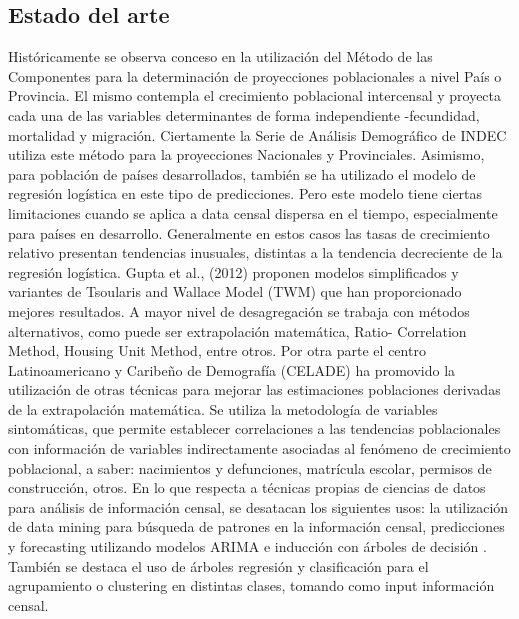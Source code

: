 \documentclass{article}
\theoremstyle{mytheoremstyle}
\theoremstyle{mytheoremstyle}
\theoremstyle{myproblemstyle}
\begin{document}
  \subsection{Estado del arte}
Históricamente se observa conceso en la utilización del Método de las Componentes para la determinación de proyecciones
poblacionales a nivel País o Provincia. El mismo contempla el crecimiento poblacional intercensal y proyecta cada una
de las variables determinantes de forma independiente -fecundidad, mortalidad y migración.\newline  
Ciertamente la Serie de Análisis Demográfico de INDEC utiliza este método para la proyecciones Nacionales y Provinciales.
Asimismo, para población de países desarrollados, también se ha utilizado el modelo de regresión logística en este tipo de predicciones. Pero este modelo tiene ciertas limitaciones cuando se aplica a data censal dispersa en el tiempo, especialmente para países en desarrollo. Generalmente en estos casos las tasas de crecimiento relativo presentan tendencias inusuales, distintas a la tendencia decreciente de la regresión logística. Gupta et al., (2012) proponen modelos simplificados y variantes de Tsoularis and Wallace Model (TWM) que han proporcionado mejores resultados.
A mayor nivel de desagregación se trabaja con métodos alternativos, como puede ser extrapolación matemática, 
Ratio- Correlation Method, Housing Unit Method, entre otros.\newline
Por otra parte el centro Latinoamericano y Caribeño de Demografía (CELADE) ha promovido la utilización 
de otras técnicas para mejorar las estimaciones poblaciones derivadas de la extrapolación matemática. 
Se utiliza la metodología de variables sintomáticas, que permite establecer correlaciones a las tendencias poblacionales
con información de variables indirectamente asociadas al fenómeno de crecimiento poblacional,
a saber: nacimientos y defunciones, matrícula escolar, permisos de construcción, otros.\newline 
En lo que respecta a técnicas propias de ciencias de datos para análisis de información censal, 
se desatacan los siguientes usos: la utilización de data mining para búsqueda de patrones en la información censal,
predicciones y forecasting utilizando modelos ARIMA e inducción con árboles de decisión . 
También se destaca el uso de árboles regresión y clasificación para el agrupamiento o clustering en distintas clases,
tomando como input información censal.
\end{document}
